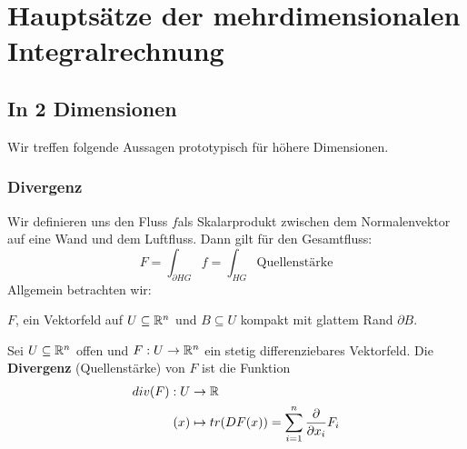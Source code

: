 \documentclass[main.tex]{subfiles}
\begin{document}
\chapter{Hauptsätze der mehrdimensionalen Integralrechnung}


\section{In 2 Dimensionen}

Wir treffen folgende Aussagen prototypisch für höhere Dimensionen.

\subsection{Divergenz}

\begin{Beispiel}
  Wir definieren uns den Fluss $f$als Skalarprodukt zwischen dem Normalenvektor auf eine Wand und dem Luftfluss. Dann gilt für den Gesamtfluss:
  $$F = \int_{\partial HG} f = \int_{HG} \text{Quellenstärke}$$
  Allgemein betrachten wir:

  $F$, ein Vektorfeld auf $U \subseteq \mathbb{R}^n$ und $B\subseteq U$ kompakt mit glattem Rand $\partial B$.
\end{Beispiel}

\begin{Definition}[Divergenz]
  Sei $U \subseteq \mathbb{R}^n$ offen und $F: U \to \mathbb{R}^n$ ein stetig differenziebares Vektorfeld. Die \textbf{Divergenz} (Quellenstärke) von $F$ ist die Funktion
  $$\begin{aligned}
    div(F): U & \to \mathbb{R} \\
    (x) & \mapsto tr (DF(x)) = \sum \limits_{i=1}^n \dfrac{\partial}{\partial x_i} F_i
  \end{aligned}$$
\end{Definition}
\end{document}
